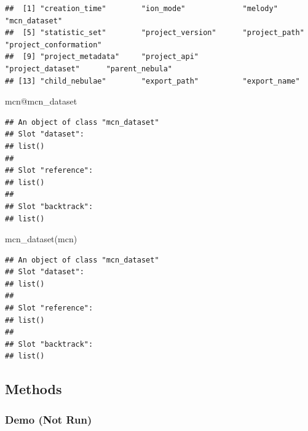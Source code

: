 \documentclass[
]{article}
\newenvironment{Shaded}{\begin{snugshade}}{\end{snugshade}}
\newcommand{\FunctionTok}[1]{\textcolor[rgb]{0.00,0.00,0.00}{#1}}
\newcommand{\NormalTok}[1]{#1}
\newcommand{\SpecialCharTok}[1]{\textcolor[rgb]{0.00,0.00,0.00}{#1}}
\begin{document}
\begin{verbatim}
##  [1] "creation_time"        "ion_mode"             "melody"               "mcn_dataset"         
##  [5] "statistic_set"        "project_version"      "project_path"         "project_conformation"
##  [9] "project_metadata"     "project_api"          "project_dataset"      "parent_nebula"       
## [13] "child_nebulae"        "export_path"          "export_name"
\end{verbatim}

\begin{Shaded}
\begin{Highlighting}[]
\NormalTok{mcn}\SpecialCharTok{@}\NormalTok{mcn\_dataset}
\end{Highlighting}
\end{Shaded}

\begin{verbatim}
## An object of class "mcn_dataset"
## Slot "dataset":
## list()
## 
## Slot "reference":
## list()
## 
## Slot "backtrack":
## list()
\end{verbatim}

\begin{Shaded}
\begin{Highlighting}[]
\FunctionTok{mcn\_dataset}\NormalTok{(mcn)}
\end{Highlighting}
\end{Shaded}

\begin{verbatim}
## An object of class "mcn_dataset"
## Slot "dataset":
## list()
## 
## Slot "reference":
## list()
## 
## Slot "backtrack":
## list()
\end{verbatim}

\hypertarget{methods}{%
\subsection{Methods}\label{methods}}

\hypertarget{demo-not-run}{%
\subsubsection{Demo (Not Run)}\label{demo-not-run}}
\end{document}
